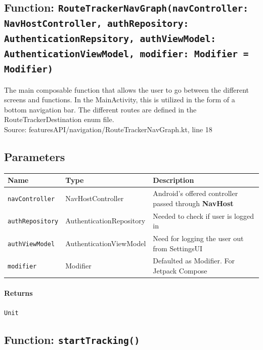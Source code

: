 \documentclass{article}
\begin{document}
            \subsection*{Function: \texttt{RouteTrackerNavGraph(navController: NavHostController, authRepository: AuthenticationRepsitory, 
            authViewModel: AuthenticationViewModel, modifier: Modifier = Modifier)}}

                The main composable function that allows the user to go between the different screens and 
                functions. In the MainActivity, this is utilized in the form of a bottom navigation bar.
                The different routes are defined in the RouteTrackerDestination enum file. \\
                Source: featuresAPI/navigation/RouteTrackerNavGraph.kt, line 18

                \subsection*{Parameters}

                \begin{tabular}{p{3cm} p{4cm} p{7cm}}
                \toprule
                \textbf{Name} & \textbf{Type} & \textbf{Description} \\ \midrule
                \texttt{navController} & NavHostController & Android's offered controller passed through \textbf{NavHost} \\ \addlinespace
                \texttt{authRepository} & AuthenticationRepository & Needed to check if user is logged in \\ \addlinespace
                \texttt{authViewModel} & AuthenticationViewModel & Need for logging the user out from SettingsUI \\ \addlinespace
                \texttt{modifier} & Modifier & Defaulted as Modifier. For Jetpack Compose \\ \bottomrule
                \end{tabular}

                \paragraph{Returns} \texttt{Unit}

            \hrulefill


            \subsection*{Function: \texttt{startTracking()}}
\end{document}
